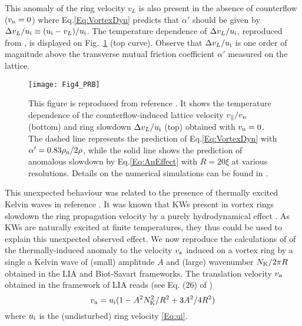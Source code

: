 \documentclass[sn-mathphys]{sn-jnl}%
\begin{document}
This anomaly of the ring velocity $v_L$ is also present in the absence of counterflow ($v_{\rm n}=0$) where Eq.\eqref{Eq:VortexDyn} predicts that $\alpha'$ should be given by $\Delta v_{L}/u_{\rm i}\equiv(u_{\rm i}-v_{L})/u_{\rm i}$. 
The temperature dependence of $\Delta v_{L}/u_{\rm i}$, reproduced from \cite{Krstulovic11b}, is displayed on Fig.~\ref{Fig:alphap} (top curve). 
Observe that $\Delta v_{L}/u_{\rm i}$ is one order of magnitude above the transverse mutual friction coefficient $\alpha'$ measured on the lattice. 

\begin{figure}[htbp]
\begin{center}
\texttt{[image: Fig4\_PRB]}
\caption{This figure is reproduced from reference \cite{Krstulovic11b}. It shows the temperature dependence of the counterflow-induced lattice velocity $v_{\parallel}/v_{\rm n}$ (bottom) and ring slowdown $\Delta v_{L}/u_{\rm i}$ (top) obtained with $v_{\rm n}=0$. The dashed line represents the prediction of Eq.\eqref{Eq:VortexDyn} with $\alpha'=0.83\rho_{\rm n}/2\rho$, while the solid line shows the prediction of anomalous slowdown by Eq.\eqref{Eq:AnEffect} with $R=20\xi$ at various resolutions. {Details on the numerical simulations can be found in \cite{Krstulovic11b}.} }
\label{Fig:alphap}
\end{center}
\end{figure}

This unexpected behaviour was related to the presence of thermally excited Kelvin waves in reference \cite{Krstulovic11b}. It was known that KWs present in vortex rings slowdown the ring propagation velocity by a purely hydrodynamical effect \cite{Kiknadze:2002p3905,Barenghi:2006p3901}. As KWs are naturally excited at finite temperatures, they thus could be used to explain this unexpected observed effect. We now reproduce the calculations of \cite{Krstulovic11b} of the thermally-induced anomaly to the velocity $v_{\rm a}$ induced on a vortex ring by a single a Kelvin wave of (small) amplitude $A$ and (large) wavenumber $N_{\rm K}/2\pi R$ obtained in the LIA \cite{Kiknadze:2002p3905} and Biot-Savart \cite{Barenghi:2006p3901} frameworks.
%
The translation velocity $v_{\rm a}$ obtained in the framework of LIA reads (see Eq. (26) of \cite{Kiknadze:2002p3905})
\begin{equation}
v_{\rm a}= u_{\rm i}(1-A^2N_{\rm K}^2/R^2+3A^2/4R^2)\label{Eq:AneffKik}
\end{equation}
where  $u_{\rm i}$ is the (undisturbed) ring velocity \eqref{Eq:ui}.
\end{document}
